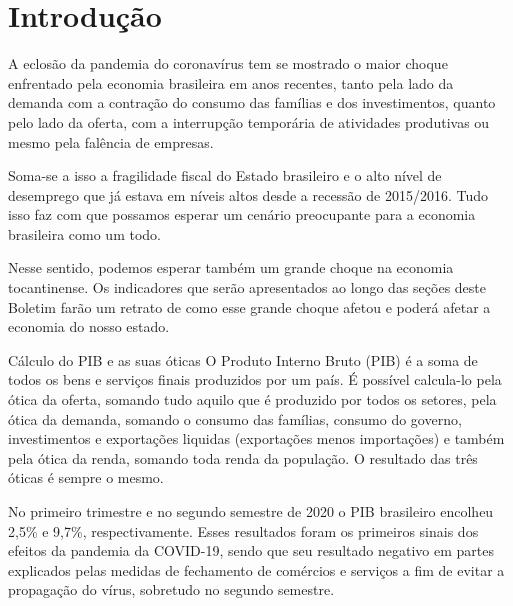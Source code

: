 \chapter{Introdução}
\par A eclosão da pandemia do coronavírus tem se mostrado o maior choque enfrentado pela economia brasileira em anos recentes, tanto pela lado da demanda com a contração do consumo das famílias e dos investimentos, quanto pelo lado da oferta, com a interrupção temporária de atividades produtivas ou mesmo pela falência de empresas.

Soma-se a isso a fragilidade fiscal do Estado brasileiro e o alto nível de desemprego que já estava em níveis altos desde a recessão de 2015/2016. Tudo isso faz com que possamos esperar um cenário preocupante para a economia brasileira como um todo.


\par Nesse sentido, podemos esperar também um grande choque na economia tocantinense. Os indicadores que serão apresentados ao longo das seções deste Boletim farão um retrato de como esse grande choque afetou e poderá afetar a economia do nosso estado.
\begin{smbox}[label={labelbox},nameref={Cálculo do PIB e as suas óticas}]{Cálculo do PIB e as suas óticas}
	O Produto Interno Bruto (PIB) é a soma de todos os bens e serviços finais produzidos por um país. É possível calcula-lo pela ótica da oferta, somando tudo aquilo que é produzido por todos os setores, pela ótica da demanda, somando o consumo das famílias, consumo do governo, investimentos e exportações liquidas (exportações menos importações) e também pela ótica da renda, somando toda renda da população. O resultado das três óticas é sempre o mesmo.
\end{smbox}
\par No primeiro trimestre e no segundo semestre de 2020 o PIB brasileiro encolheu 2,5\% e 9,7\%, respectivamente. Esses resultados foram os primeiros sinais dos efeitos da pandemia da COVID-19, sendo que seu resultado negativo em partes explicados pelas medidas de fechamento de comércios e serviços a fim de evitar a propagação do vírus, sobretudo no segundo semestre.

